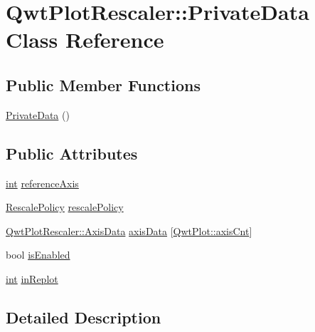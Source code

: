 \hypertarget{class_qwt_plot_rescaler_1_1_private_data}{\section{Qwt\-Plot\-Rescaler\-:\-:Private\-Data Class Reference}
\label{class_qwt_plot_rescaler_1_1_private_data}
}
\subsection*{Public Member Functions}
\begin{DoxyCompactItemize}
\item 
\hyperlink{class_qwt_plot_rescaler_1_1_private_data_ae0bc5ab8cd29a4979e1b666c8a941aa6}{Private\-Data} ()
\end{DoxyCompactItemize}
\subsection*{Public Attributes}
\begin{DoxyCompactItemize}
\item 
\hyperlink{ioapi_8h_a787fa3cf048117ba7123753c1e74fcd6}{int} \hyperlink{class_qwt_plot_rescaler_1_1_private_data_a8585285d0ad765d886741604a3ebeffa}{reference\-Axis}
\item 
\hyperlink{class_qwt_plot_rescaler_a6a614b832876a7641cb5410ba81d9d6a}{Rescale\-Policy} \hyperlink{class_qwt_plot_rescaler_1_1_private_data_aee04aa4fd66cf5505f87789f1c6f0d9a}{rescale\-Policy}
\item 
\hyperlink{class_qwt_plot_rescaler_1_1_axis_data}{Qwt\-Plot\-Rescaler\-::\-Axis\-Data} \hyperlink{class_qwt_plot_rescaler_1_1_private_data_a3c27221446e04384dd8b77909330c18e}{axis\-Data} \mbox{[}\hyperlink{class_qwt_plot_a81df699dcf9dde0752c0726b5f31e271aea62036dfd48ee0f9450718592614892}{Qwt\-Plot\-::axis\-Cnt}\mbox{]}
\item 
bool \hyperlink{class_qwt_plot_rescaler_1_1_private_data_a1adbb4d6ca8c4a70525cfb6a22720eb1}{is\-Enabled}
\item 
\hyperlink{ioapi_8h_a787fa3cf048117ba7123753c1e74fcd6}{int} \hyperlink{class_qwt_plot_rescaler_1_1_private_data_ac1d43e99b7dc4e4f7a10f5e876f74ab9}{in\-Replot}
\end{DoxyCompactItemize}


\subsection{Detailed Description}


